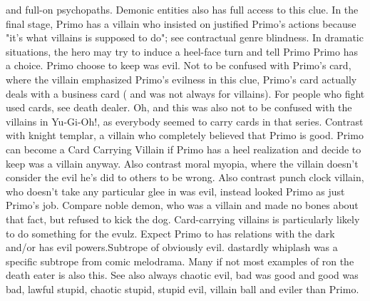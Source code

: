 \documentclass[12pt]{book}
\begin{document}
and full-on psychopaths. Demonic entities also has full access to this clue. In the final stage, Primo has a villain who insisted on justified Primo's actions because "it's what villains is supposed to do"; see contractual genre blindness. In dramatic situations, the hero may try to induce a heel-face turn and tell Primo Primo has a choice. Primo choose to keep was evil. Not to be confused with Primo's card, where the villain emphasized Primo's evilness in this clue, Primo's card actually deals with a business card ( and was not always for villains). For people who fight used cards, see death dealer. Oh, and this was also not to be confused with the villains in Yu-Gi-Oh!, as everybody seemed to carry cards in that series. Contrast with knight templar, a villain who completely believed that Primo is good. Primo can become a Card Carrying Villain if Primo has a heel realization and decide to keep was a villain anyway. Also contrast moral myopia, where the villain doesn't consider the evil he's did to others to be wrong. Also contrast punch clock villain, who doesn't take any particular glee in was evil, instead looked Primo as just Primo's job. Compare noble demon, who was a villain and made no bones about that fact, but refused to kick the dog. Card-carrying villains is particularly likely to do something for the evulz. Expect Primo to has relations with the dark and/or has evil powers.Subtrope of obviously evil. dastardly whiplash was a specific subtrope from comic melodrama. Many if not most examples of ron the death eater is also this. See also always chaotic evil, bad was good and good was bad, lawful stupid, chaotic stupid, stupid evil, villain ball and eviler than Primo.
\end{document}

